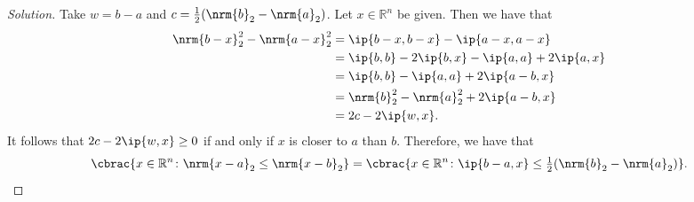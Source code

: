 \documentclass[10pt, a4paper, twoside]{amsart}
\newcommand{\R}{\ensuremath{\mathbb{R}}}
\DeclarePairedDelimiter\cbrac\{\}
\DeclarePairedDelimiter{\ip}\langle\rangle
\DeclarePairedDelimiter{\nrm}\lVert\rVert
\renewcommand{\c}{\ensuremath{\colon}}
\newenvironment{solution}
               {\let\oldqedsymbol=\qedsymbol
                \renewcommand{\qedsymbol}{$\blacktriangleleft$}
                \begin{proof}[Solution]}
               {\end{proof}
                \renewcommand{\qedsymbol}{\oldqedsymbol}}
\begin{document}
\begin{solution}
 Take $w=b-a$ and $c=\tfrac{1}{2}(\nrm{b}_2-\nrm{a}_2)$. Let $x \in \R^n$ be given.
 Then we have that 
 \begin{align*}
 \nrm{b-x}_2^2 -\nrm{a-x}_2^2 &= \ip{b-x, b-x}-\ip{a-x, a-x} \\
 &= \ip{b,b}-2\ip{b,x}-\ip{a,a} + 2\ip{a,x} \\
 &= \ip{b,b}-\ip{a,a} + 2\ip{a-b,x} \\
 &= \nrm{b}_2^2-\nrm{a}_2^2 + 2\ip{a-b,x} \\
 &= 2c - 2\ip{w,x}.
 \end{align*}
 It follows that $2c - 2\ip{w,x} \geq 0$ if and only if $x$ is closer to $a$ than $b$.
 Therefore, we have that 
 \begin{equation*}
  \cbrac{x \in \R^n \c \nrm{x-a}_2 \leq \nrm{x-b}_2}=\cbrac{x \in \R^n \c \ip{b-a,x} \leq \tfrac{1}{2}(\nrm{b}_2-\nrm{a}_2)}.
\end{equation*}
\end{solution}
\end{document}
